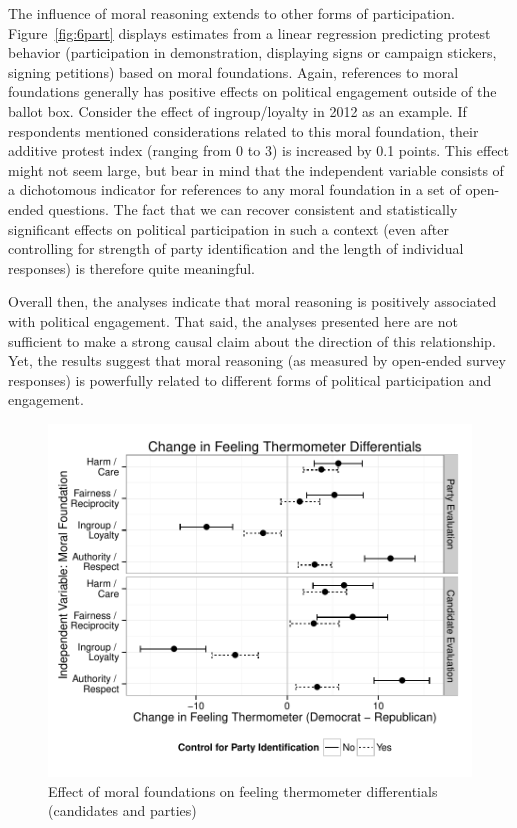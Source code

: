 \documentclass[12pt]{article}
\begin{document}
The influence of moral reasoning extends to other forms of participation. Figure~\ref{fig:6part} displays estimates from a linear regression predicting protest behavior (participation in demonstration, displaying signs or campaign stickers, signing petitions) based on moral foundations. Again, references to moral foundations generally has positive effects on political engagement outside of the ballot box. Consider the effect of ingroup/loyalty in 2012 as an example. If respondents mentioned considerations related to this moral foundation, their additive protest index (ranging from 0 to 3) is increased by 0.1 points. This effect might not seem large, but bear in mind that the independent variable consists of a dichotomous indicator for references to any moral foundation in a set of open-ended questions. The fact that we can recover consistent and statistically significant effects on political participation in such a context (even after controlling for strength of party identification and the length of individual responses) is therefore quite meaningful.

Overall then, the analyses indicate that moral reasoning is positively associated with political engagement. That said, the analyses presented here are not sufficient to make a strong causal claim about the direction of this relationship. Yet, the results suggest that moral reasoning (as measured by open-ended survey responses) is powerfully related to different forms of political participation and engagement.

\begin{figure}[ht]\centering
\includegraphics{../calc/fig/fig7feel.pdf}
\caption{Effect of moral foundations on feeling thermometer differentials (candidates and parties)}\label{fig:7feel}
\end{figure}
\end{document}
